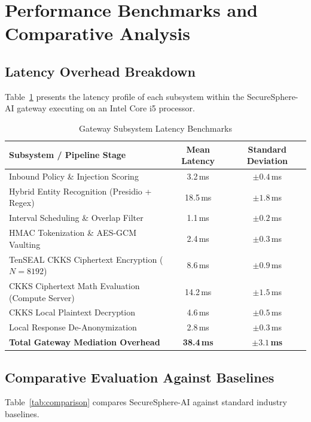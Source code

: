 \documentclass[12pt,a4paper,oneside]{report}
\numberwithin{equation}{chapter}
\begin{document}
\section{Performance Benchmarks and Comparative Analysis}

\subsection{Latency Overhead Breakdown}
Table~\ref{tab:latency_benchmarks} presents the latency profile of each subsystem within the SecureSphere-AI gateway executing on an Intel Core i5 processor.

\begin{table}[htbp]
\centering
\caption{Gateway Subsystem Latency Benchmarks}\label{tab:latency_benchmarks}
\begin{tabular}{lcc}
\toprule
\textbf{Subsystem / Pipeline Stage} & \textbf{Mean Latency} & \textbf{Standard Deviation} \\
\midrule
Inbound Policy \& Injection Scoring & 3.2\,ms & $\pm 0.4$\,ms \\
Hybrid Entity Recognition (Presidio + Regex) & 18.5\,ms & $\pm 1.8$\,ms \\
Interval Scheduling \& Overlap Filter & 1.1\,ms & $\pm 0.2$\,ms \\
HMAC Tokenization \& AES-GCM Vaulting & 2.4\,ms & $\pm 0.3$\,ms \\
TenSEAL CKKS Ciphertext Encryption ($N=8192$) & 8.6\,ms & $\pm 0.9$\,ms \\
CKKS Ciphertext Math Evaluation (Compute Server) & 14.2\,ms & $\pm 1.5$\,ms \\
CKKS Local Plaintext Decryption & 4.6\,ms & $\pm 0.5$\,ms \\
Local Response De-Anonymization & 2.8\,ms & $\pm 0.3$\,ms \\
\midrule
\textbf{Total Gateway Mediation Overhead} & \textbf{38.4\,ms} & \textbf{$\pm 3.1$\,ms} \\
\bottomrule
\end{tabular}
\end{table}

\subsection{Comparative Evaluation Against Baselines}
Table~\ref{tab:comparison} compares SecureSphere-AI against standard industry baselines.
\end{document}
